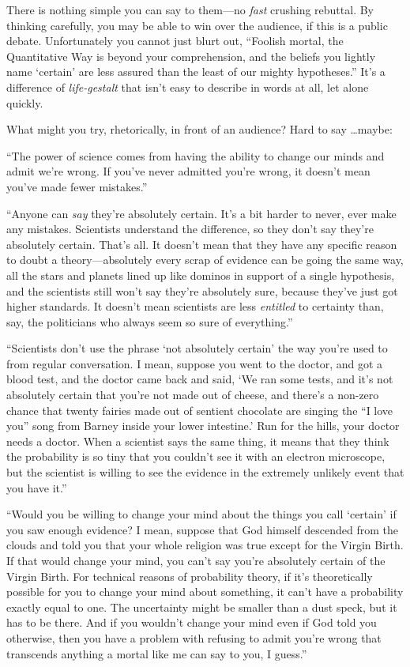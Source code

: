 {
 There is nothing simple you can say to them---no \textit{fast}
crushing rebuttal. By thinking carefully, you may be able to win over
the audience, if this is a public debate. Unfortunately you cannot just
blurt out, ``Foolish mortal, the Quantitative Way is
beyond your comprehension, and the beliefs you lightly name
`certain' are less assured than the
least of our mighty hypotheses.''
It's a difference of \textit{life-gestalt} that
isn't easy to describe in words at all, let alone
quickly.}

{
 What might you try, rhetorically, in front of an audience? Hard to
say \ldots maybe:}

{
 ``The power of science comes from having the
ability to change our minds and admit we're wrong. If
you've never admitted you're wrong, it
doesn't mean you've made fewer
mistakes.''}

{
 ``Anyone can \textit{say} they're
absolutely certain. It's a bit harder to never, ever
make any mistakes. Scientists understand the difference, so they
don't say they're absolutely certain.
That's all. It doesn't mean that they
have any specific reason to doubt a theory---absolutely every scrap of
evidence can be going the same way, all the stars and planets lined up
like dominos in support of a single hypothesis, and the scientists
still won't say they're absolutely
sure, because they've just got higher standards. It
doesn't mean scientists are less \textit{entitled} to
certainty than, say, the politicians who always seem so sure of
everything.''}

{
 ``Scientists don't use the phrase
`not absolutely certain' the way
you're used to from regular conversation. I mean,
suppose you went to the doctor, and got a blood test, and the doctor
came back and said, `We ran some tests, and
it's not absolutely certain that you're
not made out of cheese, and there's a non-zero chance
that twenty fairies made out of sentient chocolate are singing the
``I love you'' song from Barney
inside your lower intestine.' Run for the hills, your
doctor needs a doctor. When a scientist says the same thing, it means
that they think the probability is so tiny that you
couldn't see it with an electron microscope, but the
scientist is willing to see the evidence in the extremely unlikely
event that you have it.''}

{
 ``Would you be willing to change your mind about
the things you call `certain' if you saw
enough evidence? I mean, suppose that God himself descended from the
clouds and told you that your whole religion was true except for the
Virgin Birth. If that would change your mind, you can't
say you're absolutely certain of the Virgin Birth. For
technical reasons of probability theory, if it's
theoretically possible for you to change your mind about something, it
can't have a probability exactly equal to one. The
uncertainty might be smaller than a dust speck, but it has to be there.
And if you wouldn't change your mind even if God told
you otherwise, then you have a problem with refusing to admit
you're wrong that transcends anything a mortal like me
can say to you, I guess.''}

